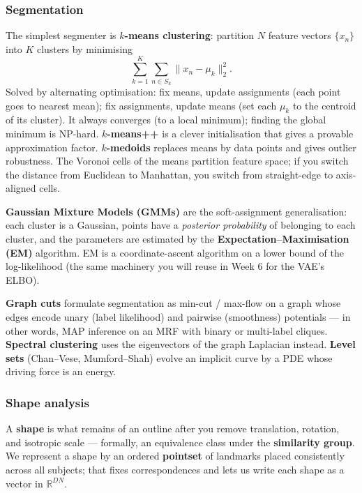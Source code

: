 \documentclass[11pt,a4paper]{article}
\newcommand{\R}{\mathbb{R}}
\begin{document}
\subsubsection{Segmentation}

The simplest segmenter is \textbf{$k$-means clustering}: partition
$N$ feature vectors $\{x_n\}$ into $K$ clusters by minimising
\begin{equation}
  \sum_{k=1}^{K}\sum_{n \in S_k} \|x_n - \mu_k\|_2^2.
\end{equation}
Solved by alternating optimisation: fix means, update assignments
(each point goes to nearest mean); fix assignments, update means (set
each $\mu_k$ to the centroid of its cluster). It always converges (to
a local minimum); finding the global minimum is NP-hard.
\textbf{$k$-means++} is a clever initialisation that gives a
provable approximation factor. \textbf{$k$-medoids} replaces means
by data points and gives outlier robustness. The Voronoi cells of
the means partition feature space; if you switch the distance from
Euclidean to Manhattan, you switch from straight-edge to
axis-aligned cells.

\textbf{Gaussian Mixture Models (GMMs)} are the soft-assignment
generalisation: each cluster is a Gaussian, points have a
\emph{posterior probability} of belonging to each cluster, and the
parameters are estimated by the \textbf{Expectation--Maximisation
(EM)} algorithm. EM is a coordinate-ascent algorithm on a lower
bound of the log-likelihood (the same machinery you will reuse in
Week 6 for the VAE's ELBO).

\textbf{Graph cuts} formulate segmentation as min-cut / max-flow on a
graph whose edges encode unary (label likelihood) and pairwise
(smoothness) potentials --- in other words, MAP inference on an
MRF with binary or multi-label cliques. \textbf{Spectral clustering}
uses the eigenvectors of the graph Laplacian instead. \textbf{Level
sets} (Chan--Vese, Mumford--Shah) evolve an implicit curve by a PDE
whose driving force is an energy.

\subsubsection{Shape analysis}

A \textbf{shape} is what remains of an outline after you remove
translation, rotation, and isotropic scale --- formally, an
equivalence class under the
\textbf{similarity group}. We represent a shape by an ordered
\textbf{pointset} of landmarks placed consistently across all
subjects; that fixes correspondences and lets us write each shape
as a vector in $\R^{DN}$.
\end{document}
